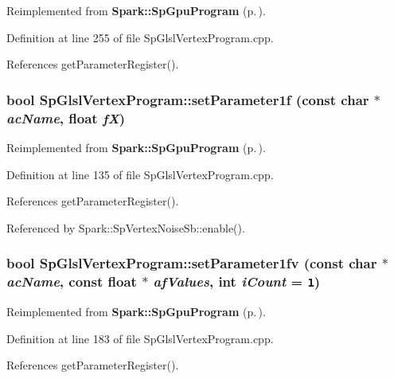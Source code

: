 Reimplemented from {\bf Spark::Sp\-Gpu\-Program} {\rm (p.\,\pageref{classSpark_1_1SpGpuProgram_a30})}.

Definition at line 255 of file Sp\-Glsl\-Vertex\-Program.cpp.

References get\-Parameter\-Register().
\subsubsection{\setlength{\rightskip}{0pt plus 5cm}bool Sp\-Glsl\-Vertex\-Program::set\-Parameter1f (const char $\ast$ {\em ac\-Name}, float {\em f\-X})\hspace{0.3cm}{\tt  [virtual]}}\label{classSpark_1_1SpGlslVertexProgram_a9}




Reimplemented from {\bf Spark::Sp\-Gpu\-Program} {\rm (p.\,\pageref{classSpark_1_1SpGpuProgram_a20})}.

Definition at line 135 of file Sp\-Glsl\-Vertex\-Program.cpp.

References get\-Parameter\-Register().

Referenced by Spark::Sp\-Vertex\-Noise\-Sb::enable().
\subsubsection{\setlength{\rightskip}{0pt plus 5cm}bool Sp\-Glsl\-Vertex\-Program::set\-Parameter1fv (const char $\ast$ {\em ac\-Name}, const float $\ast$ {\em af\-Values}, int {\em i\-Count} = {\tt 1})\hspace{0.3cm}{\tt  [virtual]}}\label{classSpark_1_1SpGlslVertexProgram_a13}




Reimplemented from {\bf Spark::Sp\-Gpu\-Program} {\rm (p.\,\pageref{classSpark_1_1SpGpuProgram_a24})}.

Definition at line 183 of file Sp\-Glsl\-Vertex\-Program.cpp.

References get\-Parameter\-Register().
